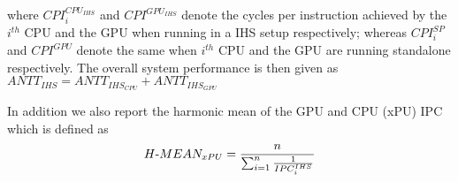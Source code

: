 where ${CPI_i^{CPU_{IHS}}}$ and $CPI^{GPU_{IHS}}$ denote the cycles per instruction achieved by the $i^{th}$ CPU and the GPU when running in a IHS setup respectively; whereas $CPI_i^{SP}$ and $CPI^{GPU}$ denote the same when $i^{th}$ CPU and the GPU are running standalone respectively. The overall system performance is then given as $ANTT_{IHS} = ANTT_{IHS_{CPU}} + ANTT_{IHS_{GPU}} $
\par In addition we also report the harmonic mean of the GPU and CPU (xPU) IPC  which is defined as 
{\small
\begin{equation}
H\textnormal{-}MEAN_{xPU} = \frac{n}{\sum_{i=1}^{n} \frac{1}{IPC_{i}^{IHS}}} 
\end{equation}
}

